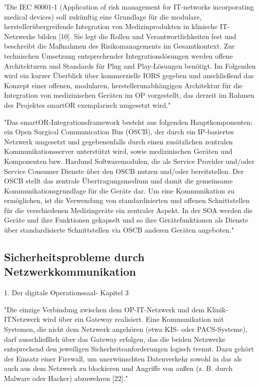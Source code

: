 	"Die IEC 80001-1 (Application of risk management for IT-networks incorporating
	medical devices) soll zukünftig eine Grundlage für die modulare, herstellerübergreifende
	Integration von Medizinprodukten in klinische IT-Netzwerke bilden [10]. Sie
	legt die Rollen und Verantwortlichkeiten fest und beschreibt die Maßnahmen des
	Risikomanagements im Gesamtkontext.
	Zur technischen Umsetzung entsprechender Integrationslösungen werden offene
	Architekturen und Standards für Plug and Play-Lösungen benötigt. Im Folgenden wird
	ein kurzer Überblick über kommerzielle IORS gegeben und anschließend das Konzept
	einer offenen, modularen, herstellerunabhängigen Architektur für die Integration
	von medizinischen Geräten im OP vorgestellt, das derzeit im Rahmen des Projektes
	smartOR exemplarisch umgesetzt wird."
	
	"Das smartOR-Integrationsframework besteht aus folgenden Hauptkomponenten:
	ein Open Surgical Communication Bus (OSCB), der durch ein IP-basiertes Netzwerk
	umgesetzt und gegebenenfalls durch einen zusätzlichen zentralen Kommunikationsserver
	unterstützt wird, sowie medizinischen Geräten und Komponenten bzw. Hardund
	Softwaremodulen, die als Service Provider und/oder Service Consumer Dienste
	über den OSCB nutzen und/oder bereitstellen.
	Der OSCB stellt das zentrale Übertragungsmedium und damit die gemeinsame
	Kommunikationsgrundlage für die Geräte dar. Um eine Kommunikation zu ermöglichen,
	ist die Verwendung von standardisierten und offenen Schnittstellen für die
	verschiedenen Medizingeräte ein zentraler Aspekt. In der SOA werden die Geräte und
	ihre Funktionen gekapselt und so ihre Gerätefunktionen als Dienste über standardisierte
	Schnittstellen via OSCB anderen Geräten angeboten."
	
\subsection{Sicherheitsprobleme durch Netzwerkkommunikation}
1. Der digitale Operationssaal- Kapitel 3

	"Die einzige Verbindung zwischen dem OP-IT-Netzwerk und dem Klinik-ITNetzwerk
	wird über ein Gateway realisiert. Eine Kommunikation mit Systemen, die
	nicht dem Netzwerk angehören (etwa KIS- oder PACS-Systeme), darf ausschließlich
	über das Gateway erfolgen, das die beiden Netzwerke entsprechend den jeweiligen
	Sicherheitsanforderungen logisch trennt. Dazu gehört der Einsatz einer Firewall, um
	unerwünschten Datenverkehr sowohl in das als auch aus dem Netzwerk zu blockieren
	und Angriffe von außen (z. B. durch Malware oder Hacker) abzuwehren [22]."
	
